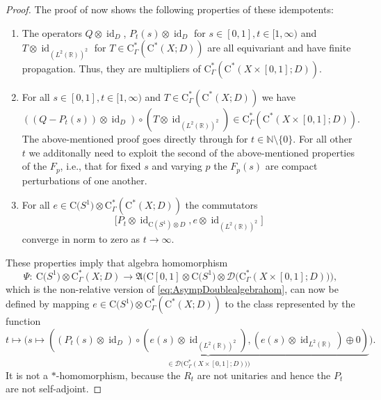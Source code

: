 \documentclass[pdftex]{sigma}
\numberwithin{equation}{section}
\theoremstyle{definition}
\newcommand{\N}{\mathbb{N}}
\newcommand{\R}{\mathbb{R}}
\newcommand{\Ct}{\mathrm{C}}
\DeclareMathOperator{\id}{id}
\newcommand{\Roe}{\mathrm{C}^*}
\newcommand{\doubleplier}{{\mathcal{D}}}
\newcommand{\Asymp}{\mathfrak{A}}
\begin{document}
\begin{proof}
The proof of \cite[Lemma 5.11]{HigsonRoeHomotopy} now shows the following properties of these idempotents:
\begin{enumerate}\itemsep=0pt
\item[$\bullet$] The operators $Q\otimes\id_D$, $P_t(s)\otimes\id_D$ for $s\in[0,1],t\in[1,\infty)$ and $T\otimes \id_{(L^2(\R))^2}$ for $T\in \Roe_\Gamma(\Roe(X;D))$ are all equivariant and have finite propagation. Thus, they are multipliers of $\Roe_\Gamma(\Roe(X\times[0,1];D))$.

\item[$\bullet$] For all $s\in[0,1],t\in[1,\infty)$ and $T\in \Roe_\Gamma(\Roe(X;D))$ we have
\[
((Q-P_t(s))\otimes\id_D)\circ(T\otimes \id_{(L^2(\R))^2})\in \Roe_\Gamma(\Roe(X\times[0,1];D)).
\]
The above-mentioned proof goes directly through for $t\in\N\setminus\{0\}$. For all other $t$ we additonally need to exploit the second of the above-mentioned properties of the $F_p$, i.e., that for fixed $s$ and varying $p$ the $F_p(s)$ are compact perturbations of one another.

\item[$\bullet$] For all $e\in \Ct\big(S^1\big)\otimes \Roe_\Gamma(\Roe(X;D))$ the commutators
\[
\big[P_t\otimes\id_{\Ct(S^1)\otimes D},e\otimes\id_{(L^2(\R))^2}\big]
\]
converge in norm to zero as $t\to\infty$.
\end{enumerate}

These properties imply that algebra homomorphism
\[
\Psi\colon\ \Ct\big(S^1\big)\otimes\Roe_\Gamma(X;D)\to \Asymp\big(\Ct[0,1]\otimes\Ct\big(S^1\big)\otimes\doubleplier\big(\Roe_\Gamma(X\times[0,1];D)\big)\big),
\]
{\sloppy which is the non-relative version of \eqref{eq:AsympDoublealgebrahom},
can now be defined by mapping $e\in \Ct\big(S^1\big)\otimes\allowbreak \Roe_\Gamma(\Roe(X;D))$ to the class represented by the function
\[
t\mapsto \Biggl(s\mapsto \underbrace{((P_t(s)\otimes\id_D)\circ (e(s)\otimes\id_{(L^2(\R))^2}),(e(s)\otimes\id_{L^2(\R)})\oplus 0)}_{\in\doubleplier\big(\Roe_\Gamma(X\times[0,1];D))\big)}\Biggr).
\]}\noindent
It is not a $*$-homomorphism, because the $R_t$ are not unitaries and hence the $P_t$ are not self-adjoint.


\end{proof}
\end{document}

